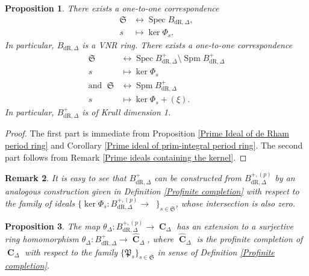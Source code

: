 \documentclass{amsart}
\newtheorem{proposition}{Proposition}[section]
\newtheorem{remark}[proposition]{Remark}
\DeclareMathOperator{\spm}{Spm}
\DeclareMathOperator{\spec}{Spec}
\DeclareMathOperator{\C}{\textbf{C}}
\newcommand{\mBdrp}{B^+_{\mathrm{dR},\Delta}}
\newcommand{\pmBdrp}{B^{+,(p)}_{\mathrm{dR},\Delta}}
\DeclareMathOperator{\Bdrp}{B^+_{dR}}
\newcommand{\mBdr}{B_{\mathrm{dR},\Delta}}
\begin{document}
\begin{proposition}
    There exists a one-to-one correspondence 
    \begin{align*}
        \mathfrak{S}&\leftrightarrow\spec\mBdr,\\
            s       &\mapsto \ker\Phi_s.
    \end{align*}
    In particular, $\mBdr$ is a VNR ring. There exists a one-to-one correspondence
    \begin{align*}
          \mathfrak{S}&\leftrightarrow \spec\mBdrp\setminus \spm\mBdrp\\
                    s &\mapsto \ker\Phi_s\\
       \text{and }\;\mathfrak{S}&\leftrightarrow\spm\mBdrp\\
                              s &\mapsto \ker\Phi_s+(\xi).
    \end{align*}
    In particular, $\mBdrp$ is of Krull dimension 1.
\end{proposition}

\begin{proof}
    The first part is immediate from Proposition \ref{Prime Ideal of de Rham period ring} and Corollary \ref{Prime ideal of prim-integral period ring}. The second part follows from Remark \ref{Prime ideals containing the kernel}.
\end{proof}

\begin{remark}
    It is easy to see that $\mBdrp$ can be constructed from $\pmBdrp$ by an analogous construction given in Definition \ref{Profinite completion} with respect to the family of ideals $\Big\{\ker\Phi_s:\pmBdrp\to\Bdrp\Big\}_{s\in\mathfrak{S}}$, whose intersection is also zero.
\end{remark}

\begin{proposition}
    The map $\theta_\Delta:\pmBdrp\to\C_\Delta$ has an extension to a surjective ring homomorphism $\theta_\Delta:\mBdrp\to\widehat{\C}_\Delta$, where $\widehat{\C}_\Delta$ is the profinite completion of $\C_\Delta$ with respect to the family $\{\mathfrak{P}_s\}_{s\in\mathfrak{S}}$ in sense of Definition \ref{Profinite completion}.
\end{proposition}
\end{document}
